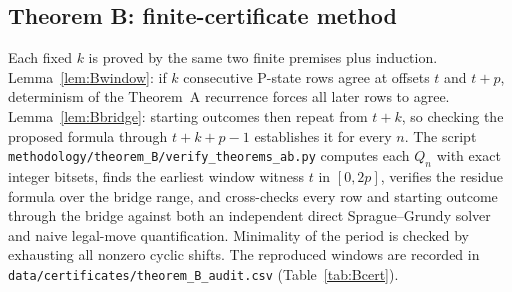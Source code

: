\subsection{Theorem B: finite-certificate method}\label{sec:methodB}
Each fixed $k$ is proved by the same two finite premises plus induction. Lemma~\ref{lem:Bwindow}: if $k$ consecutive P-state rows agree at offsets $t$ and $t+p$, determinism of the Theorem~A recurrence forces all later rows to agree. Lemma~\ref{lem:Bbridge}: starting outcomes then repeat from $t+k$, so checking the proposed formula through $t+k+p-1$ establishes it for every $n$.
The script \texttt{methodology/theorem\_B/verify\_theorems\_ab.py} computes each $Q_n$ with exact integer bitsets, finds the earliest window witness $t$ in $[0,2p]$, verifies the residue formula over the bridge range, and cross-checks every row and starting outcome through the bridge against both an independent direct Sprague--Grundy solver and naive legal-move quantification. Minimality of the period is checked by exhausting all nonzero cyclic shifts. The reproduced windows are recorded in \texttt{data/certificates/theorem\_B\_audit.csv} (Table~\ref{tab:Bcert}).
